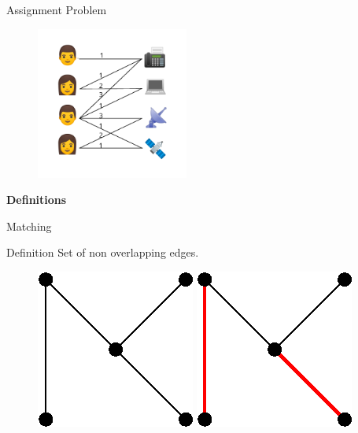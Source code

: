 \begin{frame}{Assignment Problem}
\begin{figure}
    \centering
    \includegraphics[height=5cm]{img/introduction/assignment.png}
\end{figure}
\end{frame}

\begin{frame}
	\centering \textbf{\huge Definitions}
\end{frame}


\begin{frame}[t]{Matching}
  \begin{block}{Definition}
    Set of non overlapping edges.
  \end{block} 

  \vspace{1em}
  \begin{figure}
    \centering
    \includegraphics[width=.25\linewidth]{img/introduction/graph01.eps}
    \hspace{2em}	
    \includegraphics[width=.25\linewidth]{img/introduction/graph02.eps}
  \end{figure}	
\end{frame}

